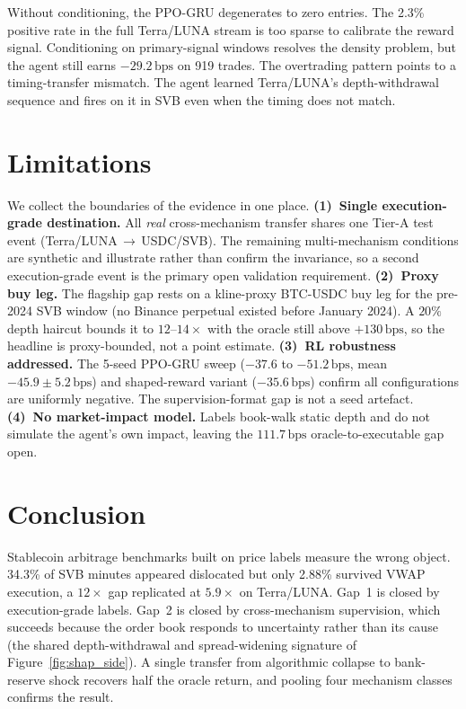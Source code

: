 \documentclass[sigconf,anonymous,natbib=false]{acmart}
\newcommand{\bps}{\,\text{bps}}
\begin{document}
Without conditioning, the PPO-GRU degenerates to zero entries. The
2.3\% positive rate in the full Terra/LUNA stream is too sparse to
calibrate the reward signal.
Conditioning on primary-signal windows resolves the density problem,
but the agent still earns $-29.2\bps$ on 919 trades.
The overtrading pattern points to a timing-transfer mismatch. The
agent learned Terra/LUNA's depth-withdrawal sequence and fires on it
in SVB even when the timing does not match.




\section{Limitations}
\label{sec:limitations}
We collect the boundaries of the evidence in one place.
\textbf{(1)~Single execution-grade destination.} All \emph{real} cross-mechanism
transfer shares one Tier-A test event (Terra/LUNA$\,\to\,$USDC/SVB). The remaining
multi-mechanism conditions are synthetic and illustrate rather than confirm the
invariance, so a second execution-grade event is the primary open validation
requirement. \textbf{(2)~Proxy buy leg.} The flagship gap rests on a kline-proxy
BTC-USDC buy leg for the pre-2024 SVB window (no Binance perpetual existed before
January 2024). A $20\%$ depth haircut bounds it to $12$--$14\times$ with the oracle
still above $+130\bps$, so the headline is proxy-bounded, not a point estimate.
\textbf{(3)~RL robustness addressed.} The 5-seed PPO-GRU sweep ($-37.6$ to $-51.2\bps$, mean $-45.9\pm5.2\bps$) and shaped-reward variant ($-35.6\bps$) confirm all configurations are uniformly negative. The supervision-format gap is not a seed artefact. \textbf{(4)~No market-impact model.} Labels book-walk
static depth and do not simulate the agent's own impact, leaving the $111.7\bps$
oracle-to-executable gap open.

\section{Conclusion}
\label{sec:conclusion}

Stablecoin arbitrage benchmarks built on price labels measure the wrong object. 34.3\% of SVB minutes appeared dislocated but only 2.88\% survived VWAP execution, a $12\times$ gap replicated at $5.9\times$ on Terra/LUNA.
Gap~1 is closed by execution-grade labels. Gap~2 is closed by cross-mechanism supervision, which succeeds because the order book responds to uncertainty rather than its cause (the shared depth-withdrawal and spread-widening signature of Figure~\ref{fig:shap_side}).
A single transfer from algorithmic collapse to bank-reserve shock recovers half the oracle return, and pooling four mechanism classes confirms the result.
\end{document}
